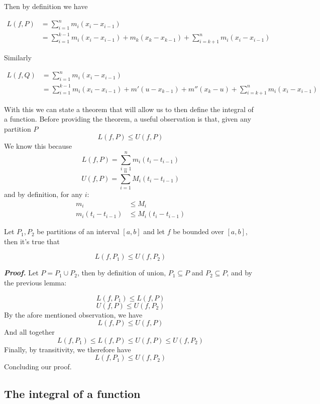 \documentclass{report}
\begin{document}
    Then by definition we have

    \begin{align*}
        L(f,P) &= \sum_{i=1}^{n} m_i(x_i-x_{i-1})\\
        &= \sum_{i=1}^{k-1}m_i(x_i-x_{i-1}) + m_k(x_k-x_{k-1}) + \sum_{i=k+1}^{n}m_i(x_i-x_{i-1})
    \end{align*}

    Similarly

    \begin{align*}
        L(f,Q) &= \sum_{i=1}^{n} m_i(x_i-x_{i-1})\\
        &= \sum_{i=1}^{k-1}m_i(x_i-x_{i-1}) + m'(u-x_{k-1}) + m''(x_k-u) + \sum_{i=k+1}^{n}m_i(x_i-x_{i-1})
    \end{align*}


    With this we can state a theorem that will allow us to then define the integral of a function. Before providing the theorem, a useful observation is that, given any partition $P$
    $$L(f, P) \leq U(f, P)$$
    We know this because
    $$L(f, P) = \sum_{i=1}^{n}m_i(t_{i} - t_{i-1})$$
    $$U(f, P) = \sum_{i=1}^{n}M_i(t_{i} - t_{i-1})$$
    and by definition, for any $i$:
    \begin{align*}
        m_i &\leq M_i\\
        m_i(t_{i} - t_{i-1}) &\leq M_i(t_{i} - t_{i-1})
    \end{align*}

    \begin{thBox}
        Let $P_1, P_2$ be partitions of an interval $[a,b]$ and let $f$ be bounded over $[a,b]$, then it's true that

        $$L(f, P_1) \leq U(f, P_2)$$
    \end{thBox}

    \textit{\textbf{Proof.}} Let $P = P_1 \cup P_2$, then by definition of union, $P_1 \subseteq P$ and $P_2 \subseteq P$, and by the previous lemma:

    $$L(f, P_1) \leq L(f, P)$$
    $$U(f, P) \leq U(f, P_2)$$
    By the afore mentioned observation, we have
    $$L(f, P) \leq U(f, P)$$
    And all together
    $$L(f, P_1) \leq L(f, P) \leq U(f, P) \leq U(f, P_2)$$
    Finally, by transitivity, we therefore have
    $$L(f, P_1) \leq U(f, P_2)$$
    Concluding our proof.


    \subsection*{The integral of a function}
\end{document}
